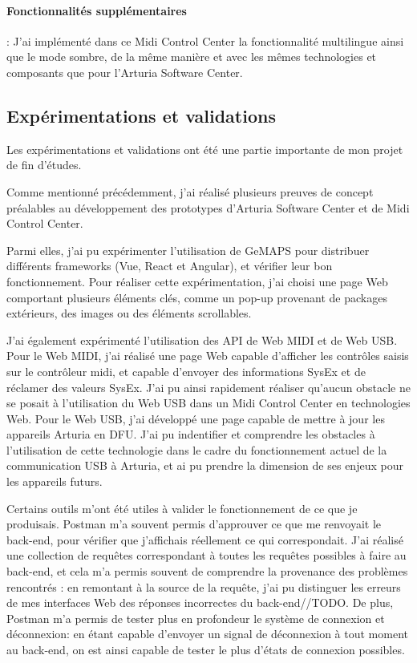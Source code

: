 \documentclass[francais]{rapportPFE}  %
\begin{document}
\paragraph{Fonctionnalités supplémentaires}:
J'ai implémenté dans ce Midi Control Center la fonctionnalité multilingue ainsi que le mode sombre, de la même manière et avec les mêmes technologies et composants que pour l'Arturia Software Center.

\subsection{Expérimentations et validations}

Les expérimentations et validations ont été une partie importante de mon projet de fin d'études.

Comme mentionné précédemment, j'ai réalisé plusieurs preuves de concept préalables au développement des prototypes d'Arturia Software Center et de Midi Control Center.

Parmi elles, j'ai pu expérimenter l'utilisation de GeMAPS pour distribuer différents frameworks (Vue, React et Angular), et vérifier leur bon fonctionnement. Pour réaliser cette expérimentation, j'ai choisi une page Web comportant plusieurs éléments clés, comme un pop-up provenant de packages extérieurs, des images ou des éléments scrollables.

J'ai également expérimenté l'utilisation des API de Web MIDI et de Web USB.
Pour le Web MIDI, j'ai réalisé une page Web capable d'afficher les contrôles saisis sur le contrôleur midi, et capable d'envoyer des informations SysEx et de réclamer des valeurs SysEx. J'ai pu ainsi rapidement réaliser qu'aucun obstacle ne se posait à l'utilisation du Web USB dans un Midi Control Center en technologies Web.
Pour le Web USB, j'ai développé une page capable de mettre à jour les appareils Arturia en DFU. J'ai pu indentifier et comprendre les obstacles à l'utilisation de cette technologie dans le cadre du fonctionnement actuel de la communication USB à Arturia, et ai pu prendre la dimension de ses enjeux pour les appareils futurs.

Certains outils m'ont été utiles à valider le fonctionnement de ce que je produisais. Postman m'a souvent permis d'approuver ce que me renvoyait le back-end, pour vérifier que j'affichais réellement ce qui correspondait. J'ai réalisé une collection de requêtes correspondant à toutes les requêtes possibles à faire au back-end, et cela m'a permis souvent de comprendre la provenance des problèmes rencontrés : en remontant à la source de la requête, j'ai pu distinguer les erreurs de mes interfaces Web des réponses incorrectes du back-end//TODO. De plus, Postman m'a permis de tester plus en profondeur le système de connexion et déconnexion: en étant capable d'envoyer un signal de déconnexion à tout moment au back-end, on est ainsi capable de tester le plus d'états de connexion possibles.
\end{document}
